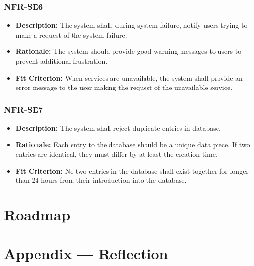 \documentclass{article}
\begin{document}
\subsubsection*{NFR-SE6}
\begin{itemize}
  \item \textbf{Description:} The system shall, during system failure, notify users trying to make a request of the system failure.
  \item \textbf{Rationale:} The system should provide good warning messages to users to prevent additional frustration.
  \item \textbf{Fit Criterion:} When services are unavailable, the system shall provide an error message to the user making the request of the unavailable service.
\end{itemize}

\subsubsection*{NFR-SE7}
\begin{itemize}
  \item \textbf{Description:} The system shall reject duplicate entries in database.
  \item \textbf{Rationale:} Each entry to the database should be a unique data piece. If two entries are identical, they must differ by at least the creation time.
  \item \textbf{Fit Criterion:} No two entries in the database shall exist together for longer than 24 hours from their introduction into the database.
\end{itemize}



\section{Roadmap}


\newpage{}

\section*{Appendix --- Reflection}



\end{document}
